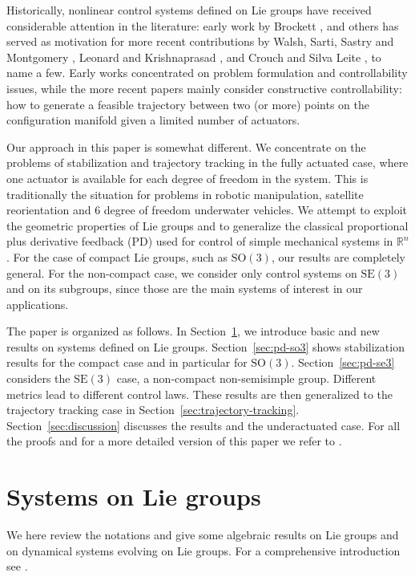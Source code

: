 \documentclass[10pt,twocolumn]{article}
\newcommand{\SO}{\mathrm{SO}}
\newcommand{\SE}{\mathrm{SE}}
\newcommand{\R}{\mathbb R}
\begin{document}
Historically, nonlinear control systems defined on Lie groups have received considerable attention in the literature: early work by Brockett \cite{2,3}, and others has served as motivation for more recent contributions by Walsh, Sarti, Sastry and Montgomery \cite{4,5}, Leonard and Krishnaprasad \cite{6}, and Crouch and Silva Leite \cite{7}, to name a few. Early works concentrated on problem formulation and controllability issues, while the more recent papers mainly consider constructive controllability: how to generate a feasible trajectory between two (or more) points on the configuration manifold given a limited number of actuators.

Our approach in this paper is somewhat different. We concentrate on the problems of stabilization and trajectory tracking in the fully actuated case, where one actuator is available for each degree of freedom in the system. This is traditionally the situation for problems in robotic manipulation, satellite reorientation and 6 degree of freedom underwater vehicles. We attempt to exploit the geometric properties of Lie groups and to generalize the classical proportional plus derivative feedback (PD) used for control of simple mechanical systems in $\R^n$. For the case of compact Lie groups, such as $\SO(3)$, our results are completely general. For the non-compact case, we consider only control systems on $\SE(3)$ and on its subgroups, since those are the main systems of interest in our applications.

The paper is organized as follows. In Section~\ref{sec:systems-lie-groups}, we introduce basic and new results on systems defined on Lie groups. Section~\ref{sec:pd-so3} shows stabilization results for the compact case and in particular for $\SO(3)$. Section~\ref{sec:pd-se3} considers the $\SE(3)$ case, a non-compact non-semisimple group. Different metrics lead to different control laws. These results are then generalized to the trajectory tracking case in Section~\ref{sec:trajectory-tracking}. Section~\ref{sec:discussion} discusses the results and the underactuated case. For all the proofs and for a more detailed version of this paper we refer to \cite{8}.

\section{Systems on Lie groups}\label{sec:systems-lie-groups}
We here review the notations and give some algebraic results on Lie groups and on dynamical systems evolving on Lie groups. For a comprehensive introduction see \cite{1}.
\end{document}
